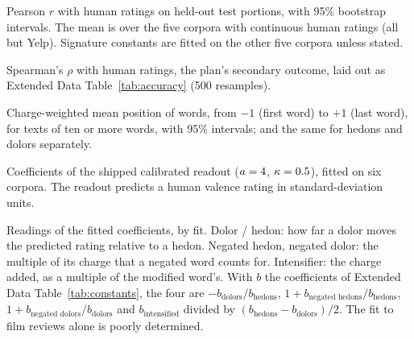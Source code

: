 \setcounter{table}{0}\setcounter{figure}{0}
\renewcommand{\tablename}{Extended Data Table}
\renewcommand{\figurename}{Extended Data Fig.}
\begin{table}[h]
\centering\sffamily\scriptsize
\caption{Pearson $r$ with human ratings on held-out test portions, with 95\% bootstrap intervals. The mean is over the five corpora with continuous human ratings (all but Yelp). Signature constants are fitted on the other five corpora unless stated.}
\label{tab:accuracy}

\end{table}

\begin{table}[h]
\centering\sffamily\scriptsize
\caption{Spearman's $\rho$ with human ratings, the plan's secondary outcome, laid out as Extended Data Table~\ref{tab:accuracy} (500 resamples).}
\label{tab:spearman}

\end{table}

\begin{table}[h]
\centering\sffamily\scriptsize
\caption{Charge-weighted mean position of words, from $-1$ (first word) to $+1$ (last word), for texts of ten or more words, with 95\% intervals; and the same for hedons and dolors separately.}
\label{tab:where}

\end{table}

\begin{table}[h]
\centering\sffamily\scriptsize
\caption{Coefficients of the shipped calibrated readout ($a=\shipA$, $\kappa=\shipKappa$), fitted on six corpora. The readout predicts a human valence rating in standard-deviation units.}
\label{tab:constants}

\end{table}

\begin{table}[h]
\centering\sffamily\scriptsize
\caption{Readings of the fitted coefficients, by fit. Dolor / hedon: how far a dolor moves the predicted rating relative to a hedon. Negated hedon, negated dolor: the multiple of its charge that a negated word counts for. Intensifier: the charge added, as a multiple of the modified word's. With $b$ the coefficients of Extended Data Table~\ref{tab:constants}, the four are $-b_{\text{dolors}}/b_{\text{hedons}}$, $1+b_{\text{negated hedons}}/b_{\text{hedons}}$, $1+b_{\text{negated dolors}}/b_{\text{dolors}}$ and $b_{\text{intensified}}$ divided by $(b_{\text{hedons}}-b_{\text{dolors}})/2$. The fit to film reviews alone is poorly determined.}
\label{tab:readings}

\end{table}

